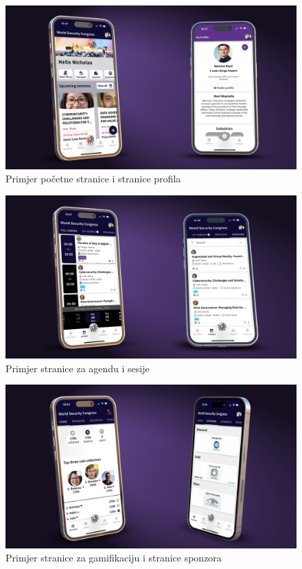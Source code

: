 		\begin{figure}[ht]
			\centering
			\includegraphics[width=1\linewidth]{slike/runevents-homeandprofile.png}
			\caption{Primjer početne stranice i stranice profila}
			\label{fig:home-profile}
		\end{figure}
		
		\begin{figure}
			\centering
			\includegraphics[width=1\linewidth]{slike/runevents-agenda.png}
			\caption{Primjer stranice za agendu i sesije}
			\label{fig:agenda-sessions}
		\end{figure}
		
		\begin{figure}
			\centering
			\includegraphics[width=1\linewidth]{slike/runevents-gameandsponsors.png}
			\caption{Primjer stranice za gamifikaciju i stranice sponzora}
			\label{fig:game-sponsors}
		\end{figure}
		

